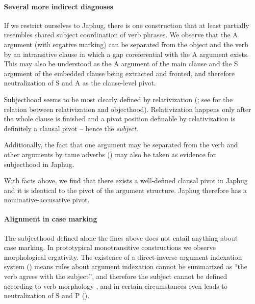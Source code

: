 \documentclass[a4paper, oneside, 12pt]{report}
\newcommand*{\citepage}[1]{p.~{#1}}
\newcommand*{\term}[1]{\emph{#1}}
\begin{document}
\paragraph*{Several more indirect diagnoses}
If we restrict ourselves to Japhug,
there is one construction that at least partially resembles
shared subject coordination of verb phrases.
We observe that the A argument (with ergative marking) 
can be separated from the object and the verb 
by an intransitive clause \citep[\citepage{306}]{jacques2021grammar}
in which a gap coreferential with the A argument exists.
This may also be understood 
as the A argument of the main clause and the S argument of the embedded clause
being extracted and fronted,
and therefore neutralization of S and A as the clause-level pivot.

Subjecthood seems to be most clearly defined by relativization
(\citealt{jacques2016subjects};
see  for the relation 
between relativization and objecthood).
Relativization happens only after the whole clause is finished
and a pivot position definable by relativization is definitely a clausal pivot
-- hence the \term{subject}.

Additionally, the fact that one argument may be separated from
the verb and other arguments by \ac{tame} adverbs
()
may also be taken as evidence for subjecthood in Japhug.

With facts above, we find that there exists a well-defined clausal pivot in Japhug
and it is identical to the pivot of the argument structure.
Japhug therefore has a nominative-accusative pivot.

\paragraph*{Alignment in case marking}
The subjecthood defined alone the lines above does not entail
anything about case marking.
In prototypical monotransitive constructions
we observe morphological ergativity.
The existence of a direct-inverse argument indexation system ()
means rules about argument indexation cannot be summarized as 
``the verb agrees with the subject'',
and therefore the subject cannot be defined according to verb morphology \citep{jacques2016subjects},
and in certain circumstances even leads to neutralization of S and P
().
\end{document}
